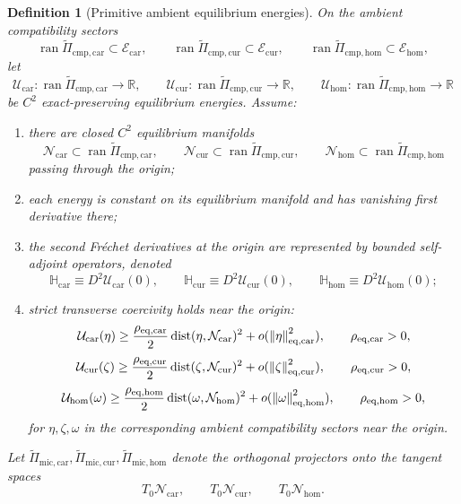 \documentclass[11pt]{article}
\newcommand{\TensorEqClass}{\mathscr E_{\mathrm{car}}}
\newcommand{\CurEqClass}{\mathscr E_{\mathrm{cur}}}
\newcommand{\HomEqClass}{\mathscr E_{\mathrm{hom}}}
\newcommand{\TensorAmbientHess}{\mathbb H_{\mathrm{car}}}
\newcommand{\CurAmbientHess}{\mathbb H_{\mathrm{cur}}}
\newcommand{\HomAmbientHess}{\mathbb H_{\mathrm{hom}}}
\newcommand{\TensorEqCmpProj}{\widetilde\Pi_{\mathrm{cmp,car}}}
\newcommand{\CurEqCmpProj}{\widetilde\Pi_{\mathrm{cmp,cur}}}
\newcommand{\HomEqCmpProj}{\widetilde\Pi_{\mathrm{cmp,hom}}}
\newcommand{\TensorEqKerProj}{\widetilde\Pi_{\mathrm{mic,car}}}
\newcommand{\CurEqKerProj}{\widetilde\Pi_{\mathrm{mic,cur}}}
\newcommand{\HomEqKerProj}{\widetilde\Pi_{\mathrm{mic,hom}}}
\newcommand{\EqCarGap}{\rho_{\mathrm{eq,car}}}
\newcommand{\EqCurGap}{\rho_{\mathrm{eq,cur}}}
\newcommand{\EqHomGap}{\rho_{\mathrm{eq,hom}}}
\newcommand{\TensorAmbientEnergy}{\mathcal U_{\mathrm{car}}}
\newcommand{\CurAmbientEnergy}{\mathcal U_{\mathrm{cur}}}
\newcommand{\HomAmbientEnergy}{\mathcal U_{\mathrm{hom}}}
\newcommand{\TensorEqManifold}{\mathcal N_{\mathrm{car}}}
\newcommand{\CurEqManifold}{\mathcal N_{\mathrm{cur}}}
\newcommand{\HomEqManifold}{\mathcal N_{\mathrm{hom}}}
\newtheorem{definition}{Definition}
\begin{document}
\begin{definition}[Primitive ambient equilibrium energies]
\label{def:primitive_equilibrium}
On the ambient compatibility sectors
\[
\operatorname{ran}\TensorEqCmpProj\subset\TensorEqClass,\qquad
\operatorname{ran}\CurEqCmpProj\subset\CurEqClass,\qquad
\operatorname{ran}\HomEqCmpProj\subset\HomEqClass,
\]
let
\[
\TensorAmbientEnergy:\operatorname{ran}\TensorEqCmpProj\to\mathbb R,\qquad
\CurAmbientEnergy:\operatorname{ran}\CurEqCmpProj\to\mathbb R,\qquad
\HomAmbientEnergy:\operatorname{ran}\HomEqCmpProj\to\mathbb R
\]
be \(C^2\) exact-preserving equilibrium energies. Assume:
\begin{enumerate}
    \item there are closed \(C^2\) equilibrium manifolds
    \[
    \TensorEqManifold\subset\operatorname{ran}\TensorEqCmpProj,\qquad
    \CurEqManifold\subset\operatorname{ran}\CurEqCmpProj,\qquad
    \HomEqManifold\subset\operatorname{ran}\HomEqCmpProj
    \]
    passing through the origin;
    \item each energy is constant on its equilibrium manifold and has vanishing first derivative there;
    \item the second Fr\'echet derivatives at the origin are represented by bounded self-adjoint operators, denoted
    \begin{equation}
    \TensorAmbientHess\equiv D^2\TensorAmbientEnergy(0),\qquad
    \CurAmbientHess\equiv D^2\CurAmbientEnergy(0),\qquad
    \HomAmbientHess\equiv D^2\HomAmbientEnergy(0);
    \label{eq:hessians_as_second_variation}
    \end{equation}
    \item strict transverse coercivity holds near the origin:
    \begin{equation}
    \TensorAmbientEnergy(\eta)
    \ge
    \frac{\EqCarGap}{2}\operatorname{dist}(\eta,\TensorEqManifold)^2
    +o(\norm{\eta}_{\mathrm{eq,car}}^2),
    \qquad
    \EqCarGap>0,
    \label{eq:transverse_coercivity_car}
    \end{equation}
    \begin{equation}
    \CurAmbientEnergy(\zeta)
    \ge
    \frac{\EqCurGap}{2}\operatorname{dist}(\zeta,\CurEqManifold)^2
    +o(\norm{\zeta}_{\mathrm{eq,cur}}^2),
    \qquad
    \EqCurGap>0,
    \label{eq:transverse_coercivity_cur}
    \end{equation}
    \begin{equation}
    \HomAmbientEnergy(\omega)
    \ge
    \frac{\EqHomGap}{2}\operatorname{dist}(\omega,\HomEqManifold)^2
    +o(\norm{\omega}_{\mathrm{eq,hom}}^2),
    \qquad
    \EqHomGap>0,
    \label{eq:transverse_coercivity_hom}
    \end{equation}
    for \(\eta,\zeta,\omega\) in the corresponding ambient compatibility sectors near the origin.
\end{enumerate}
Let \(\TensorEqKerProj,\CurEqKerProj,\HomEqKerProj\) denote the orthogonal projectors onto the tangent spaces
\[
T_0\TensorEqManifold,\qquad
T_0\CurEqManifold,\qquad
T_0\HomEqManifold.
\]
\end{definition}
\end{document}
